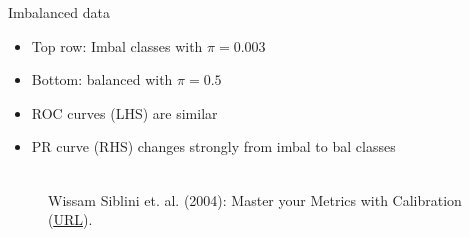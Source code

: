 \documentclass[11pt,compress,t,notes=noshow, xcolor=table]{beamer}
\begin{document}
\begin{vbframe}{Imbalanced data}

\vspace{-0.2cm}
\begin{itemize}
  \item Top row: Imbal classes with $\pi = 0.003$
  \item Bottom: balanced with $\pi = 0.5$
  \item ROC curves (LHS) are similar
  \item PR curve (RHS) changes strongly from imbal to bal classes
\end{itemize}



\begin{figure}
  \centering
  \tiny
  \\ Wissam Siblini et. al. (2004): Master your Metrics with Calibration
  (\href{https://arxiv.org/pdf/1909.02827.pdf}{\underline{URL}}).
\end{figure}

%

\end{vbframe}
\end{document}

